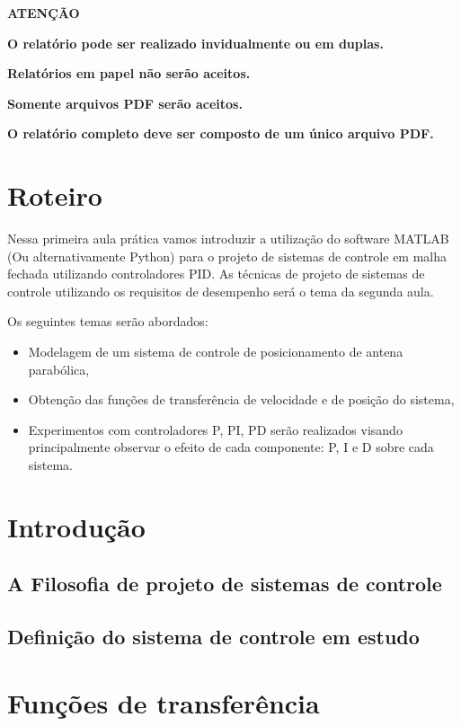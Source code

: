 \documentclass[10pt]{article}
\theoremstyle{plain}
\begin{document}
\vspace*{12pt}
{\bf ATENÇÃO} 

{\bf O relatório pode ser realizado invidualmente ou em duplas.}

{\bf Relatórios em papel não serão aceitos. }

{\bf Somente arquivos PDF serão aceitos.}

{\bf O relatório completo deve ser composto de um único arquivo PDF.}

\section{Roteiro}

Nessa primeira aula prática vamos introduzir a utilização do software MATLAB (Ou alternativamente Python) para o projeto de sistemas
de controle em malha fechada utilizando controladores PID.
As técnicas de projeto de sistemas de controle utilizando os requisitos de desempenho será o tema da segunda aula.

Os seguintes temas serão abordados:
\begin{itemize}
	\item Modelagem de um sistema de controle de posicionamento de antena parabólica,
	\item Obtenção das funções de transferência de velocidade e de posição do sistema,
	\item Experimentos com controladores P, PI, PD serão realizados visando principalmente
	      observar o efeito de cada componente: P, I e D sobre cada sistema.
\end{itemize}

\section{Introdução}

\subsection{A Filosofia de projeto de sistemas de controle}

\subsection{Definição do sistema de controle em estudo}

\section{Funções de transferência}
\end{document}
